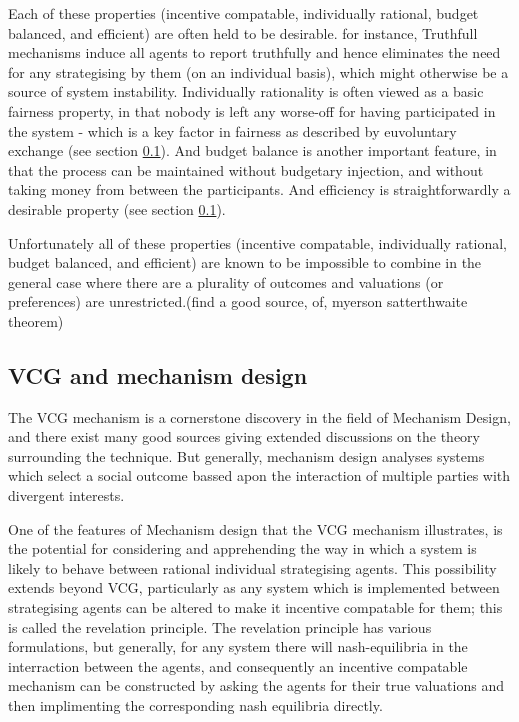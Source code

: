 Each of these properties (incentive compatable, individually rational, budget balanced, and efficient) are often held to be desirable. for instance, Truthfull mechanisms induce all agents to report truthfully and hence eliminates the need for any strategising by them (on an individual basis), which might otherwise be a source of system instability.
Individually rationality is often viewed as a basic fairness property, in that nobody is left any worse-off for having participated in the system - which is a key factor in fairness as described by euvoluntary exchange (see section \ref{}).
And budget balance is another important feature, in that the process can be maintained without budgetary injection, and without taking money from between the participants.
And efficiency is straightforwardly a desirable property (see section \ref{}).

Unfortunately all of these properties (incentive compatable, individually rational, budget balanced, and efficient) are known to be impossible to combine in the general case where there are a plurality of outcomes and valuations (or preferences) are unrestricted.(find a good source, of, myerson satterthwaite theorem)

\subsection{VCG and mechanism design}

The VCG mechanism is a cornerstone discovery in the field of Mechanism Design, and there exist many good sources giving extended discussions on the theory surrounding the technique.\cite{37377}
But generally, mechanism design analyses systems which select a social outcome bassed apon the interaction of multiple parties with divergent interests.%

One of the features of Mechanism design that the VCG mechanism illustrates, is the potential for considering and apprehending the way in which a system is likely to behave between rational individual strategising agents.
This possibility extends beyond VCG, particularly as any system which is implemented between strategising agents can be altered to make it incentive compatable for them; this is called the revelation principle.\cite{RePEc:ecm:emetrp:v:41:y:1973:i:4:p:587-601}
The revelation principle has various formulations, but generally, for any system there will nash-equilibria in the interraction between the agents, and consequently an incentive compatable mechanism can be constructed by asking the agents for their true valuations and then implimenting the corresponding nash equilibria directly.

